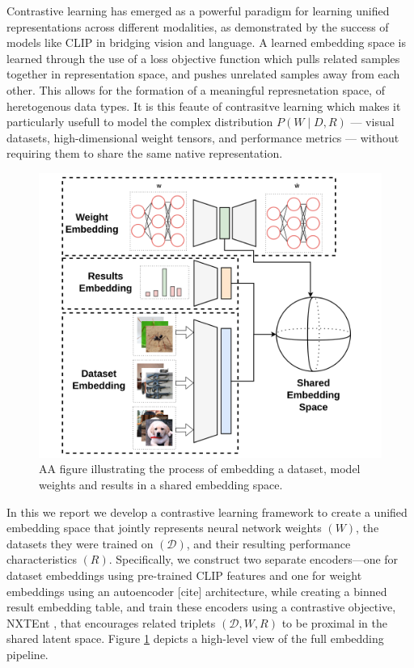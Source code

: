 Contrastive learning has emerged as a powerful paradigm for learning unified representations across different modalities, as demonstrated by the success of models like CLIP \cite{radford2021learningtransferablevisualmodels} in bridging vision and language. A learned embedding space is learned through the use of a loss objective function which pulls related samples together in representation space, and pushes unrelated samples away from each other. This allows for the formation of a meaningful represnetation space, of heretogenous data types. It is this feaute of contrasitve learning which makes it particularly usefull to model the complex distribution $P(W \mid D,R)$ --- visual datasets, high-dimensional weight tensors, and performance metrics --- without requiring them to share the same native representation.

\begin{figure}[!t]
    \centering
    \includegraphics[width=0.75\linewidth]{pipeline.png}
    \caption[A figure illustrating the process of embedding a dataset, model weigths and results into a shared embedding space ]{AA figure illustrating the process of embedding a dataset, model weights and results in a shared embedding space. }
    \label{fig:pipeline}
\end{figure}

In this we report we develop a contrastive learning framework to create a unified embedding space that jointly represents neural network weights $(W)$, the datasets they were trained on $(\mathcal{D})$, and their resulting performance characteristics $(R)$.  Specifically, we construct two separate encoders—one for dataset embeddings using pre-trained CLIP features and one for weight embeddings using an autoencoder [cite] architecture, while creating a binned result embedding table, and train these encoders using a contrastive objective, NXTEnt \cite{agren2022ntxentlossupperbound}, that encourages related triplets $(\mathcal{D}, W, R)$ to be proximal in the shared latent space. Figure \ref{fig:pipeline} depicts a high-level view of the full embedding pipeline.

